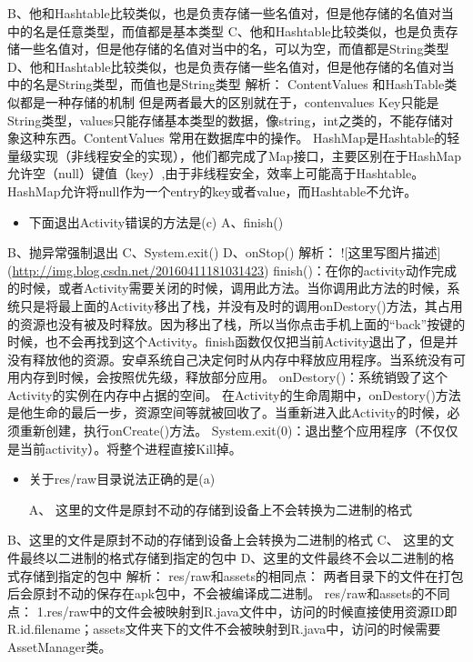 \documentclass[9pt, b5paper]{article}
\begin{document}
B、他和Hashtable比较类似，也是负责存储一些名值对，但是他存储的名值对当中的名是任意类型，而值都是基本类型
C、他和Hashtable比较类似，也是负责存储一些名值对，但是他存储的名值对当中的名，可以为空，而值都是String类型
D、他和Hashtable比较类似，也是负责存储一些名值对，但是他存储的名值对当中的名是String类型，而值也是String类型
    解析：
    ContentValues 和HashTable类似都是一种存储的机制 但是两者最大的区别就在于，contenvalues Key只能是String类型，values只能存储基本类型的数据，像string，int之类的，不能存储对象这种东西。ContentValues 常用在数据库中的操作。
    HashMap是Hashtable的轻量级实现（非线程安全的实现），他们都完成了Map接口，主要区别在于HashMap允许空（null）键值（key）,由于非线程安全，效率上可能高于Hashtable。HashMap允许将null作为一个entry的key或者value，而Hashtable不允许。
\begin{itemize}
\item 下面退出Activity错误的方法是(c)
A、finish()
\end{itemize}
B、抛异常强制退出
C、System.exit()
D、onStop()
    解析：
![这里写图片描述](\url{http://img.blog.csdn.net/20160411181031423})
finish()：在你的activity动作完成的时候，或者Activity需要关闭的时候，调用此方法。当你调用此方法的时候，系统只是将最上面的Activity移出了栈，并没有及时的调用onDestory()方法，其占用的资源也没有被及时释放。因为移出了栈，所以当你点击手机上面的“back”按键的时候，也不会再找到这个Activity。finish函数仅仅把当前Activity退出了，但是并没有释放他的资源。安卓系统自己决定何时从内存中释放应用程序。当系统没有可用内存到时候，会按照优先级，释放部分应用。
onDestory()：系统销毁了这个Activity的实例在内存中占据的空间。
在Activity的生命周期中，onDestory()方法是他生命的最后一步，资源空间等就被回收了。当重新进入此Activity的时候，必须重新创建，执行onCreate()方法。
System.exit(0)：退出整个应用程序（不仅仅是当前activity）。将整个进程直接Kill掉。
\begin{itemize}
\item 关于res/raw目录说法正确的是(a)

A、 这里的文件是原封不动的存储到设备上不会转换为二进制的格式
\end{itemize}
B、这里的文件是原封不动的存储到设备上会转换为二进制的格式
C、 这里的文件最终以二进制的格式存储到指定的包中
D、这里的文件最终不会以二进制的格式存储到指定的包中
    解析：
    res/raw和assets的相同点：
    两者目录下的文件在打包后会原封不动的保存在apk包中，不会被编译成二进制。
    res/raw和assets的不同点：
    1.res/raw中的文件会被映射到R.java文件中，访问的时候直接使用资源ID即R.id.filename；assets文件夹下的文件不会被映射到R.java中，访问的时候需要AssetManager类。
\end{document}
